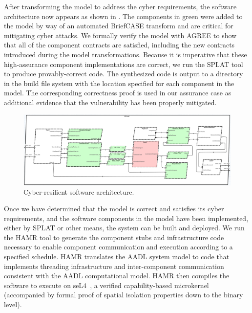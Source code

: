 
After transforming the model to address the cyber requirements, the software architecture now appears as shown in .  The components in green were added to the model by way of an automated BriefCASE transform and are critical for mitigating cyber attacks. 
We formally verify the model with AGREE to show that all of the component contracts are satisfied, including the new contracts introduced during the model transformations.
Because it is imperative that these high-assurance component implementations are correct,
we run the SPLAT tool to produce provably-correct code.  
The synthesized code is output to a directory in the build file system with the location specified for each component in the model.  The corresponding correctness proof is used in our assurance case as additional evidence that the vulnerability has been properly mitigated.

\begin{figure}[h]
	\centering
	\includegraphics[width=1\columnwidth]{figs/hardened-sw.png}
	\caption{Cyber-resilient software architecture.} 
	\label{fig:hardened-sw} 
\end{figure}

Once we have determined that the model is correct and satisfies its cyber requirements, and the software components in the model have been implemented, either by SPLAT or other means, the system can be built and deployed.  We run the HAMR tool to generate the component stubs and infrastructure code necessary to enable component communication and execution according to a specified schedule.
HAMR translates the AADL system model to code that implements threading infrastructure and inter-component communication consistent with the AADL computational model.
%
HAMR then compiles the software to execute on seL4~\cite{sel4-2009}, a verified capability-based microkernel (accompanied by formal proof of spatial isolation properties down to the binary level).

